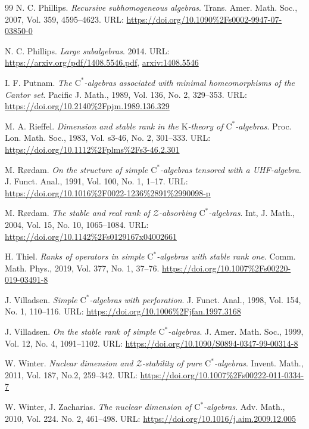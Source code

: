 \documentclass[12pt]{amsart}
\numberwithin{equation}{section}
\theoremstyle{definition}
\theoremstyle{remark}
\begin{document}
\begin{thebibliography}{99}
 N. C. Phillips. \textit{Recursive subhomogeneous algebras}. Trans. Amer. Math. Soc., 2007, Vol. 359, 4595--4623. URL: \href{https://doi.org/10.1090\%2Fs0002-9947-07-03850-0}{https://doi.org/10.1090\%2Fs0002-9947-07-03850-0}

 N. C. Phillips. \textit{Large subalgebras}. 2014. URL: \href{https://arxiv.org/pdf/1408.5546.pdf}{https://arxiv.org/pdf/1408.5546.pdf}, \href{https://arxiv.org/abs/1408.5546}{arxiv:1408.5546}	

 I. F. Putnam. \textit{The $\mathrm{C}^*$-algebras associated with minimal homeomorphisms of the Cantor set}. Pacific J. Math., 1989, Vol. 136, No. 2, 329--353. URL: \href{https://doi.org/10.2140\%2Fpjm.1989.136.329}{https://doi.org/10.2140\%2Fpjm.1989.136.329}

 M. A. Rieffel. \textit{Dimension and stable rank in the $\mathrm{K}$-theory of $\mathrm{C}^{*}$-algebras}. Proc. Lon. Math. Soc., 1983, Vol. s3-46, No. 2, 301--333. URL: \href{https://doi.org/10.1112\%2Fplms\%2Fs3-46.2.301}{https://doi.org/10.1112\%2Fplms\%2Fs3-46.2.301}

 M. R\o rdam. \textit{On the structure of simple $\mathrm{C}^*$-algebras tensored with a UHF-algebra}. J. Funct. Anal., 1991, Vol. 100, No. 1, 1--17. URL: \href{https://doi.org/10.1016\%2F0022-1236\%2891\%2990098-p}{https://doi.org/10.1016\%2F0022-1236\%2891\%2990098-p}

 M. R\o rdam. \textit{The stable and real rank of $\mathcal{Z}$-absorbing $\mathrm{C}^{*}$-algebras}. Int, J. Math., 2004, Vol. 15, No. 10, 1065--1084. URL: \href{https://doi.org/10.1142\%2Fs0129167x04002661}{https://doi.org/10.1142\%2Fs0129167x04002661}

 H. Thiel. \textit{Ranks of operators in simple $\mathrm{C}^{*}$-algebras with stable rank one}. Comm. Math. Phys., 2019, Vol. 377, No. 1, 37--76. \href{https://doi.org/10.1007\%2Fs00220-019-03491-8}{https://doi.org/10.1007\%2Fs00220-019-03491-8}

 J. Villadsen. \textit{Simple $\mathrm{C^*}$-algebras with perforation}. J. Funct. Anal., 1998, Vol. 154, No. 1, 110--116. URL: \href{https://doi.org/10.1006\%2Fjfan.1997.3168}{https://doi.org/10.1006\%2Fjfan.1997.3168} 

J. Villadsen. \textit{On the stable rank of simple $\mathrm{C^*}$-algebras}. J. Amer. Math. Soc., 1999, Vol. 12, No. 4, 1091--1102. URL: \href{https://doi.org/10.1090/S0894-0347-99-00314-8}{https://doi.org/10.1090/S0894-0347-99-00314-8}

W. Winter. \textit{Nuclear dimension and $\mathcal{Z}$-stability of pure $\mathrm{C}^{*}$-algebras}. Invent. Math., 2011, Vol. 187, No.2, 259--342. URL: \href{https://doi.org/10.1007\%2Fs00222-011-0334-7}{https://doi.org/10.1007\%2Fs00222-011-0334-7}

W. Winter, J. Zacharias. \textit{The nuclear dimension of $\mathrm{C}^{*}$-algebras}. Adv. Math., 2010, Vol. 224. No. 2, 461--498. URL: \href{https://doi.org/10.1016/j.aim.2009.12.005}{https://doi.org/10.1016/j.aim.2009.12.005}
\end{thebibliography}
\end{document}
